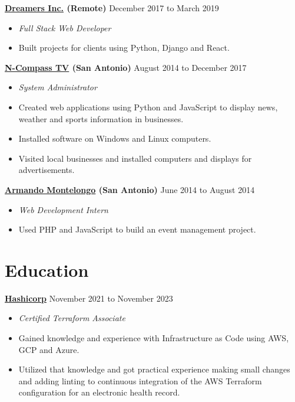\documentclass[10pt]{article}
\begin{document}
  \textbf{\href{https://thedreamers.us/}{Dreamers Inc.} (Remote)} \hfill {December 2017 to March 2019}
    \begin{itemize}
     \item[] \textit{Full Stack Web Developer}
     \item[] Built projects for clients using Python, Django and React.
    \end{itemize}

   \textbf{\href{https://n-compass.tv/}{N-Compass TV} (San Antonio)} \hfill {August 2014 to December 2017}
    \begin{itemize}
        \item[] \textit{System Administrator}
        \item[] Created web applications using Python and JavaScript to display news, weather and sports information in businesses.
        \item[] Installed software on Windows and Linux computers.
        \item[] Visited local businesses and installed computers and displays for advertisements.
    \end{itemize}

   \textbf{\href{https://armandomontelongo.com/}{Armando Montelongo} (San Antonio)} \hfill {June 2014 to August 2014}
    \begin{itemize}
     \item[] \textit{Web Development Intern}
     \item[] Used PHP and JavaScript to build an event management project.
    \end{itemize}

   \section*{Education}
   \noindent

  \textbf{\href{https://www.credly.com/badges/d4012af6-1c9f-4ca8-aa2a-931c2c3c8e5b}{Hashicorp}} \hfill {November 2021 to November 2023}
   \begin{itemize}
     \item[] \textit{Certified Terraform Associate}
     \item[] Gained knowledge and experience with Infrastructure as Code using AWS, GCP and Azure.
     \item[] Utilized that knowledge and got practical experience making small changes and adding linting to continuous integration of the AWS Terraform configuration for an electronic health record.
    \end{itemize}
\end{document}
